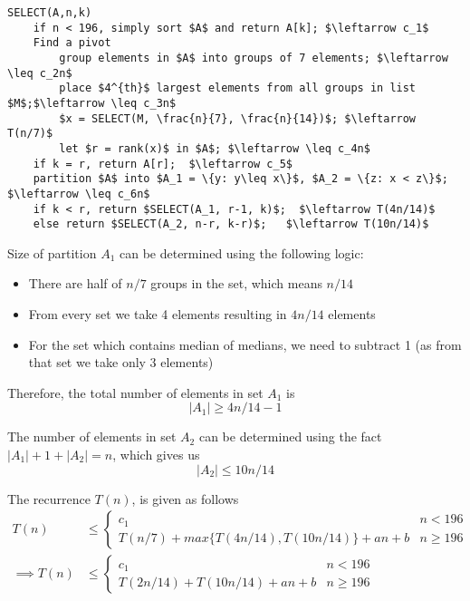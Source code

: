 \documentclass[12pt,a4paper]{article}
\begin{document}
\begin{lstlisting}[title=Modified $SELECT$ to group by 7 elements, mathescape=true]
SELECT(A,n,k)
    if n < 196, simply sort $A$ and return A[k]; $\leftarrow c_1$
    Find a pivot
        group elements in $A$ into groups of 7 elements; $\leftarrow \leq c_2n$
        place $4^{th}$ largest elements from all groups in list $M$;$\leftarrow \leq c_3n$
        $x = SELECT(M, \frac{n}{7}, \frac{n}{14})$; $\leftarrow T(n/7)$
        let $r = rank(x)$ in $A$; $\leftarrow \leq c_4n$
    if k = r, return A[r];  $\leftarrow c_5$
    partition $A$ into $A_1 = \{y: y\leq x\}$, $A_2 = \{z: x < z\}$; $\leftarrow \leq c_6n$
    if k < r, return $SELECT(A_1, r-1, k)$;  $\leftarrow T(4n/14)$
    else return $SELECT(A_2, n-r, k-r)$;   $\leftarrow T(10n/14)$
\end{lstlisting}

Size of partition $A_1$ can be determined using the following logic:
\begin{itemize}
    \item There are half of $n/7$ groups in the set, which means $n/14$
    \item From every set we take 4 elements resulting in $4n/14$ elements
    \item For the set which contains median of medians, we need to subtract 1 (as from that set we take only 3 elements)
\end{itemize}

Therefore, the total number of elements in set $A_1$ is
\begin{equation}
    |A_1| \geq 4n/14 -1
\end{equation}

The number of elements in set $A_2$ can be determined using the fact $|A_1| + 1 + |A_2| = n$, which gives us
\begin{equation}
    |A_2| \leq 10n/14
\end{equation}

The recurrence $T(n)$, is given as follows
\begin{align}
    T(n) &\leq
    \begin{cases}
        c_1 & n < 196 \\
        T(n/7) + max\{T(4n/14), T(10n/14)\} + an + b & n \geq 196
    \end{cases} \\
    \implies T(n) &\leq
    \begin{cases}
        c_1 & n < 196 \\
        T(2n/14) + T(10n/14) + an + b & n \geq 196
    \end{cases}
\end{align}
\end{document}
